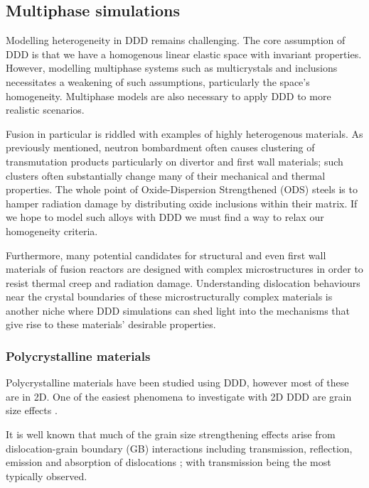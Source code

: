 \subsection{Multiphase simulations}
\label{ss:multiphase}
%
Modelling heterogeneity in DDD remains challenging. The core assumption of DDD is that we have a homogenous linear elastic space with invariant properties. However, modelling multiphase systems such as multicrystals and inclusions necessitates a weakening of such assumptions, particularly the space's homogeneity. Multiphase models are also necessary to apply DDD to more realistic scenarios.

Fusion in particular is riddled with examples of highly heterogenous materials. As previously mentioned, neutron bombardment often causes clustering of transmutation products particularly on divertor and first wall materials; such clusters often substantially change many of their mechanical and thermal properties. The whole point of Oxide-Dispersion Strengthened (ODS) steels \cite{ddd_ods} is to hamper radiation damage by distributing oxide inclusions within their matrix. If we hope to model such alloys with DDD we must find a way to relax our homogeneity criteria.

Furthermore, many potential candidates for structural and even first wall materials of fusion reactors are designed with complex microstructures in order to resist thermal creep and radiation damage. Understanding dislocation behaviours near the crystal boundaries of these microstructurally complex materials is another niche where DDD simulations can shed light into the mechanisms that give rise to these materials' desirable properties.

\subsubsection{Polycrystalline materials}
\label{ss:polycrystal}
Polycrystalline materials have been studied using DDD, however most of these are in 2D. One of the easiest phenomena to investigate with 2D DDD are grain size effects \cite{2d_pcm, 2d_pcm2}.

It is well known that much of the grain size strengthening effects arise from dislocation-grain boundary (GB) interactions including transmission, reflection, emission and absorption of dislocations \cite{grain_size_eff1, grain_size_eff2}; with transmission being the most typically observed.

